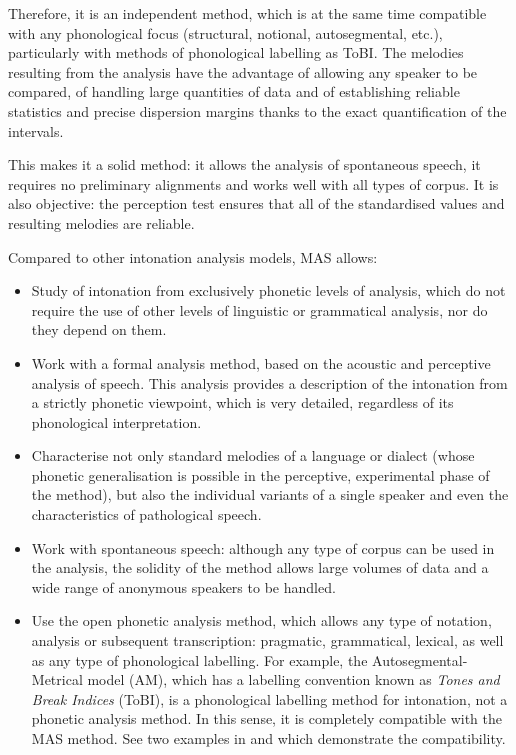 \documentclass[output=paper]{langscibook}
\begin{document}
Therefore, it is an independent method, which is at the same time compatible with any phonological focus (structural, notional, autosegmental, etc.), particularly with methods of phonological labelling as ToBI. The melodies resulting from the analysis have the advantage of allowing any speaker to be compared, of handling large quantities of data and of establishing reliable statistics and precise dispersion margins thanks to the exact quantification of the intervals.

This makes it a solid method: it allows the analysis of spontaneous speech, it requires no preliminary alignments and works well with all types of corpus. It is also objective: the perception test ensures that all of the standardised values and resulting melodies are reliable.

Compared to other intonation analysis models, MAS allows:

\begin{itemize}
\item Study of intonation from exclusively phonetic levels of analysis, which do not require the use of other levels of linguistic or grammatical analysis, nor do they depend on them.
\item Work with a formal analysis method, based on the acoustic and perceptive analysis of speech. This analysis provides a description of the intonation from a strictly phonetic viewpoint, which is very detailed, regardless of its phonological interpretation.
\item Characterise not only standard melodies of a language or dialect (whose phonetic generalisation is possible in the perceptive, experimental phase of the method), but also the individual variants of a single speaker and even the characteristics of pathological speech.
\item Work with spontaneous speech: although any type of corpus can be used in the analysis, the solidity of the method allows large volumes of data and a wide range of anonymous speakers to be handled.
\item Use the open phonetic analysis method, which allows any type of notation, analysis or subsequent transcription: pragmatic, grammatical, lexical, as well as any type of phonological labelling. For example, the Autosegmental-Metrical model (AM), which has a labelling convention known as \textit{Tones and Break Indices} (ToBI), is a phonological labelling method for intonation, not a phonetic analysis method. In this sense, it is completely compatible with the MAS method. See two examples in   and  which demonstrate the compatibility.
\end{itemize}
\end{document}
